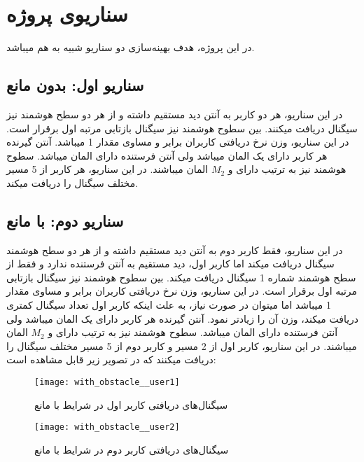 \section{سناریوی پروژه}
در این پروژه، هدف بهینه‌سازی دو سناریو شبیه به هم میباشد. 
\subsection{سناریو اول: بدون مانع}
در این سناریو، هر دو کاربر به آنتن دید مستقیم داشته و از هر دو سطح هوشمند نیز سیگنال دریافت میکنند. بین سطوح هوشمند نیز سیگنال بازتابی مرتبه اول برقرار است. در این سناریو، وزن نرخ دریافتی کاربران برابر و مساوی مقدار 1 میباشد. آنتن گیرنده هر کاربر دارای یک المان میباشد ولی آنتن فرستنده دارای  المان میباشد. سطوح هوشمند نیز به ترتیب دارای  و $M_2$ المان میباشند. در این سناریو، هر کاربر از 5 مسیر مختلف سیگنال را دریافت میکند.


\subsection{سناریو دوم: با مانع}
در این سناریو، فقط کاربر دوم به آنتن دید مستقیم داشته و از هر دو سطح هوشمند سیگنال دریافت میکند اما کاربر اول، دید مستقیم به آنتن فرستنده ندارد و فقط از سطح هوشمند شماره 1 سیگنال دریافت میکند. بین سطوح هوشمند نیز سیگنال بازتابی مرتبه اول برقرار است. در این سناریو، وزن نرخ دریافتی کاربران برابر و مساوی مقدار 1 میباشد اما میتوان در صورت نیاز، به علت اینکه کاربر اول تعداد سیگنال کمتری دریافت میکند، وزن آن را زیادتر نمود. آنتن گیرنده هر کاربر دارای یک المان میباشد ولی آنتن فرستنده دارای  المان میباشد. سطوح هوشمند نیز به ترتیب دارای  و $M_2$ المان میباشند. در این سناریو، کاربر اول از 2 مسیر و کاربر دوم از 5 مسیر مختلف سیگنال را دریافت میکنند که در تصویر زیر قابل مشاهده است:
\begin{figure}[!h]
	\centering
	\texttt{[image: with\_obstacle\_\_user1]}
	
	\caption[سیگنال‌های دریافتی کاربر اول در شرایط با مانع]{
	سیگنال‌های دریافتی کاربر اول در شرایط با مانع
	}
\end{figure}

\begin{figure}[!h]
	\centering
	\texttt{[image: with\_obstacle\_\_user2]}
	
	\caption[سیگنال‌های دریافتی کاربر دوم در شرایط با مانع]{
		سیگنال‌های دریافتی کاربر دوم در شرایط با مانع
	}
\end{figure}
\newpage

